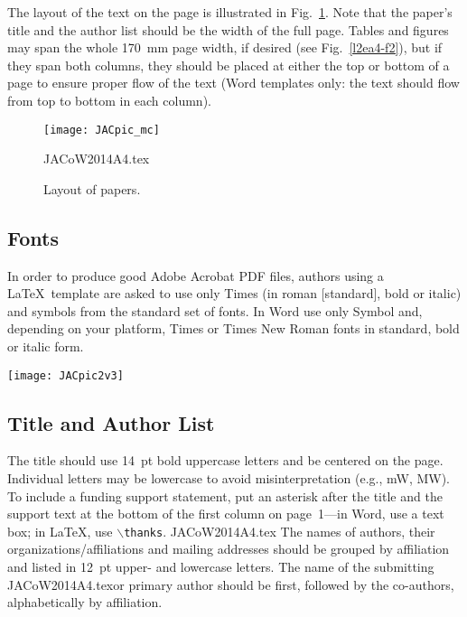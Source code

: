 \documentclass[a4paper,
              ]{jacow}
\begin{document}
The layout of the text on the page is illustrated in
Fig.~\ref{l2ea4-f1}. Note that the paper's title and the author list should be
the width of the full page. Tables and figures may span the whole \SI{170}{mm} page width,
if desired (see Fig.~\ref{l2ea4-f2}), but if they span both columns, they should be placed at
either the top or bottom of a page to ensure proper flow of the text
(Word templates only: the text should flow from top to bottom in each column).

\begin{figure}[!htb]
   \centering
   \texttt{[image: JACpic\_mc]}
   \caption{Layout of papers.}
   \label{l2ea4-f1}JACoW2014A4.tex
\end{figure}

\subsection{Fonts}

In order to produce good Adobe Acrobat PDF files,
authors using a \LaTeX\ template are asked to use only Times (in roman [standard],
bold or italic) and symbols from  the standard set of fonts. In Word use only Symbol
and, depending on your platform, Times or Times New Roman fonts in standard, bold or
italic form.

\begin{figure*}[!tbh]
    \centering
    \texttt{[image: JACpic2v3]}

    \caption{Example of a full-width figure showing the JACoW Team at their annual
             meeting in 2012. This figure has a multi-line caption that has to
             be justified rather than centered.}
    \label{l2ea4-f2}
\end{figure*}

\subsection{Title and Author List}

The title should use \SI{14}{pt} bold uppercase letters and be centered on the page.
Individual letters may be lowercase to avoid misinterpretation (e.g., mW, MW).
To include a funding support statement, put an asterisk after the title and
the support text at the bottom of the first column on page~1---in Word,
use a text box; in \LaTeX, use $\backslash$\texttt{thanks}.
JACoW2014A4.tex
The names of authors, their organizations/affiliations and mailing addresses
should be grouped by affiliation and listed in \SI{12}{pt} upper- and lowercase letters.
The name of the submitting JACoW2014A4.texor primary author should be first, followed by
the co-authors, alphabetically by affiliation.
\end{document}
